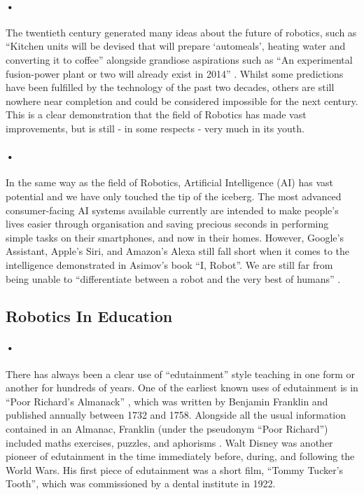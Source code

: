 \documentclass{article}
\begin{document}
\paragraph{•}
The twentieth century generated many ideas about the future of robotics, such as \enquote{Kitchen units will be devised that will prepare \enquote{automeals}, heating water and converting it to coffee} alongside grandiose aspirations such as \enquote{An experimental fusion-power plant or two will already exist in 2014} \cite{Asimov1964b}. Whilst some predictions have been fulfilled by the technology of the past two decades, others are still nowhere near completion and could be considered impossible for the next century. This is a clear demonstration that the field of Robotics has made vast improvements, but is still - in some respects - very much in its youth.
\paragraph{•}
In the same way as the field of Robotics, Artificial Intelligence (AI) has vast potential and we have only touched the tip of the iceberg. The most advanced consumer-facing AI systems available currently are intended to make people's lives easier through organisation and saving precious seconds in performing simple tasks on their smartphones, and now in their homes. However, Google's Assistant, Apple's Siri, and Amazon's Alexa still fall short when it comes to the intelligence demonstrated in Asimov's book \enquote{I, Robot}. We are still far from being unable to \enquote{differentiate between a robot and the very best of humans} \cite{Asimov1970}.

\subsection{Robotics In Education}
\paragraph{•}
There has always been a clear use of \enquote{edutainment} style teaching in one form or another for hundreds of years. One of the earliest known uses of edutainment is in \enquote{Poor Richard's Almanack} \cite{Franklin1732}, which was written by Benjamin Franklin and published annually between 1732 and 1758. Alongside all the usual information contained in an Almanac, Franklin (under the pseudonym \enquote{Poor Richard}) included maths exercises, puzzles, and aphorisms \cite{Beato2015}. Walt Disney was another pioneer of edutainment in the time immediately before, during, and following the World Wars. His first piece of edutainment was a short film, \enquote{Tommy Tucker's Tooth}, which was commissioned by a dental institute in 1922.
\end{document}
